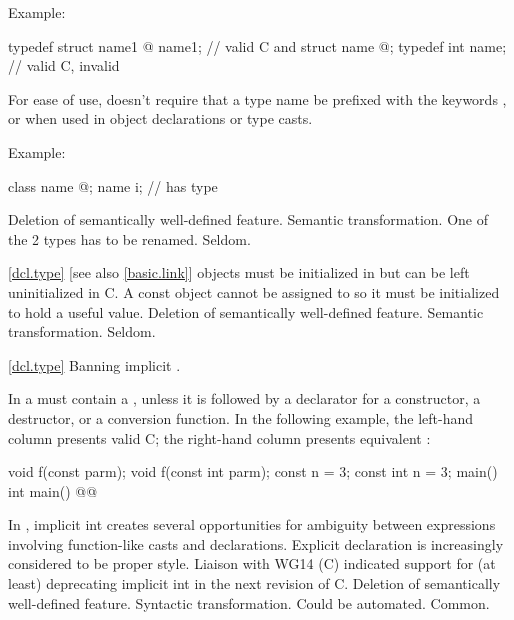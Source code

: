 Example:
\begin{codeblock}
typedef struct name1 { @\commentellip@ } name1;         // valid C and \Cpp
struct name { @\commentellip@ };
typedef int name;               // valid C, invalid \Cpp
\end{codeblock}

\rationale
For ease of use, \Cpp doesn't require that a type name be prefixed
with the keywords ,  or  when used in object
declarations or type casts.

Example:
\begin{codeblock}
class name { @\commentellip@ };
name i;                         //  has type 
\end{codeblock}

\effect
Deletion of semantically well-defined feature.
\difficulty
Semantic transformation.
One of the 2 types has to be renamed.
\howwide
Seldom.

\ref{dcl.type} [see also \ref{basic.link}]
\change {} objects must be initialized in \Cpp but can be left uninitialized in C.
\rationale
A const object cannot be assigned to so it must be initialized
to hold a useful value.
\effect
Deletion of semantically well-defined feature.
\difficulty
Semantic transformation.
\howwide
Seldom.

\ref{dcl.type}
\change Banning implicit .

In \Cpp a
must contain a
, unless
it is followed by a declarator for a constructor, a destructor, or a
conversion function.
In the following example, the
left-hand column presents valid C;
the right-hand column presents
equivalent \Cpp :

\begin{codeblock}
void f(const parm);            void f(const int parm);
const n = 3;                   const int n = 3;
main()                         int main()
    @\commentellip@                      @\commentellip@
\end{codeblock}

\rationale
In \Cpp, implicit int creates several opportunities for
ambiguity between expressions involving function-like
casts and declarations.
Explicit declaration is increasingly considered
to be proper style.
Liaison with WG14 (C) indicated support for (at least)
deprecating implicit int in the next revision of C.
\effect
Deletion of semantically well-defined feature.
\difficulty
Syntactic transformation.
Could be automated.
\howwide
Common.

